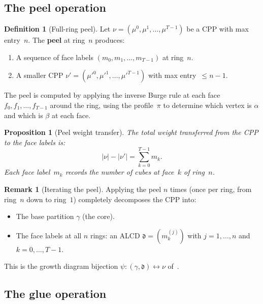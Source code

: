 \documentclass[11pt]{article}
\theoremstyle{plain}
\newtheorem{proposition}[theorem]{Proposition}
\theoremstyle{definition}
\newtheorem{definition}[theorem]{Definition}
\newtheorem{remark}[theorem]{Remark}
\begin{document}
\subsection{The peel operation}

\begin{definition}[Full-ring peel]
\label{def:peel}
Let $\nu = (\mu^0, \mu^1, \ldots, \mu^{T-1})$ be a CPP with max
entry~$n$.  The \textbf{peel} at ring~$n$ produces:
\begin{enumerate}
  \item A sequence of face labels
    $(m_0, m_1, \ldots, m_{T-1})$ at ring~$n$.
  \item A smaller CPP $\nu' = (\mu'^0, \mu'^1, \ldots, \mu'^{T-1})$
    with max entry~$\leq n-1$.
\end{enumerate}
The peel is computed by applying the inverse Burge rule at each face
$f_0, f_1, \ldots, f_{T-1}$ around the ring, using the profile~$\pi$
to determine which vertex is $\alpha$ and which is $\beta$ at each
face.
\end{definition}

\begin{proposition}[Peel weight transfer]
\label{prop:peel-weight}
The total weight transferred from the CPP to the face labels is:
\begin{equation}\label{eq:peel-weight}
  |\nu| - |\nu'| = \sum_{k=0}^{T-1} m_k.
\end{equation}
Each face label~$m_k$ records the number of cubes at face~$k$ of
ring~$n$.
\end{proposition}

\begin{remark}[Iterating the peel]
Applying the peel $n$ times (once per ring, from ring~$n$ down to
ring~$1$) completely decomposes the CPP into:
\begin{itemize}
  \item The base partition $\gamma$ (the core).
  \item The face labels at all $n$ rings: an ALCD
    $\mathfrak{d} = (m_k^{(j)})$ with $j = 1, \ldots, n$ and
    $k = 0, \ldots, T-1$.
\end{itemize}
This is the growth diagram bijection
$\psi\colon (\gamma, \mathfrak{d}) \leftrightarrow \nu$
of~\cite{UNDERLYING_SET}.
\end{remark}


\subsection{The glue operation}
\end{document}

